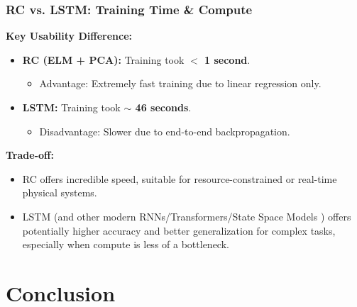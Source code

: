 \documentclass{beamer}
\begin{document}
\begin{frame}
    \frametitle{RC vs. LSTM: Training Time \& Compute}
    \textbf{Key Usability Difference:}
    \begin{itemize}
        \item \textbf{RC (ELM + PCA):} Training took \textbf{$<$ 1 second}.
            \begin{itemize}
                \item Advantage: Extremely fast training due to linear regression only.
            \end{itemize}
        \item \textbf{LSTM:} Training took \textbf{$\sim$ 46 seconds}.
            \begin{itemize}
                \item Disadvantage: Slower due to end-to-end backpropagation.
            \end{itemize}
    \end{itemize}
    \pause
    \textbf{Trade-off:}
    \begin{itemize}
        \item RC offers incredible speed, suitable for resource-constrained or real-time physical systems.
        \item LSTM (and other modern RNNs/Transformers/State Space Models \cite{gu2024mambalineartimesequencemodeling}) offers potentially higher accuracy and better generalization for complex tasks, especially when compute is less of a bottleneck.
    \end{itemize}
\end{frame}

\section{Conclusion}
\end{document}
